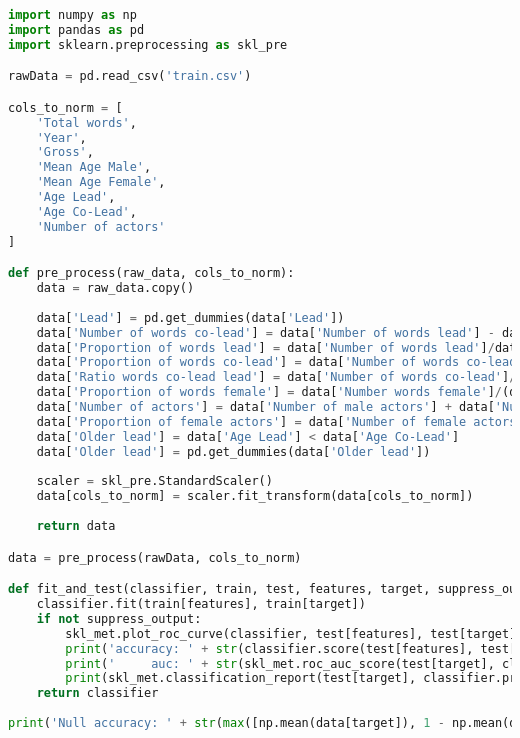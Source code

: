 \documentclass[../../project.tex]{subfiles}
\begin{document}
	\begin{lstlisting}[language=Python]
import numpy as np
import pandas as pd
import sklearn.preprocessing as skl_pre

rawData = pd.read_csv('train.csv')

cols_to_norm = [
	'Total words',
	'Year',
	'Gross',
	'Mean Age Male',
	'Mean Age Female',
	'Age Lead',
	'Age Co-Lead',
	'Number of actors'
]

def pre_process(raw_data, cols_to_norm):
	data = raw_data.copy()
	
	data['Lead'] = pd.get_dummies(data['Lead'])
	data['Number of words co-lead'] = data['Number of words lead'] - data['Difference in words lead and co-lead']
	data['Proportion of words lead'] = data['Number of words lead']/data['Total words']
	data['Proportion of words co-lead'] = data['Number of words co-lead']/data['Total words']
	data['Ratio words co-lead lead'] = data['Number of words co-lead']/data['Number of words lead']
	data['Proportion of words female'] = data['Number words female']/(data['Total words'] - data['Number of words lead'])
	data['Number of actors'] = data['Number of male actors'] + data['Number of female actors']
	data['Proportion of female actors'] = data['Number of female actors']/data['Number of actors']
	data['Older lead'] = data['Age Lead'] < data['Age Co-Lead']
	data['Older lead'] = pd.get_dummies(data['Older lead'])
	
	scaler = skl_pre.StandardScaler()
	data[cols_to_norm] = scaler.fit_transform(data[cols_to_norm])
	
	return data

data = pre_process(rawData, cols_to_norm)

def fit_and_test(classifier, train, test, features, target, suppress_output = False):
	classifier.fit(train[features], train[target])
	if not suppress_output:
		skl_met.plot_roc_curve(classifier, test[features], test[target])
		print('accuracy: ' + str(classifier.score(test[features], test[target])))
		print('     auc: ' + str(skl_met.roc_auc_score(test[target], classifier.predict_proba(test[features])[:,1])) + '\n')
		print(skl_met.classification_report(test[target], classifier.predict(test[features])))
	return classifier
	
print('Null accuracy: ' + str(max([np.mean(data[target]), 1 - np.mean(data[target])])))
	\end{lstlisting}
\end{document}
